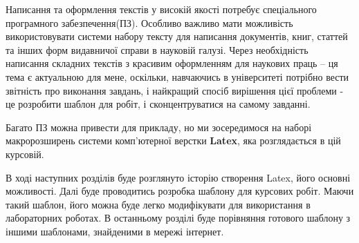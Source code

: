 
Написання та оформлення текстів у високій якості потребує спеціального програмного забезпечення(ПЗ). Особливо важливо мати можливість використовувати системи набору тексту для написання документів, книг, статтей та інших форм видавничої справи в науковій галузі. Через необхідність написання складних текстів з красивим оформленням для наукових праць -- ця тема є актуальною для мене, оскільки, навчаючись в університеті потрібно вести звітність про виконання завдань, і найкращий спосіб вирішення цієї проблеми - це розробити шаблон для робіт, і сконцентруватися на самому завданні.

Багато ПЗ можна привести для прикладу, но ми зосередимося на наборі макророзширень системи комп'ютерної верстки \textbf{Latex}, яка розглядається в цій курсовій.

В ході наступних розділів буде розглянуто історію створення Latex, його основні можливості. Далі буде проводитись розробка шаблону для курсових робіт. Маючи такий шаблон, його можна буде легко модифікувати для використання в лабораторних роботах. В останньому розділі буде порівняння готового шаблону з іншими шаблонами, знайденими в мережі інтернет.
